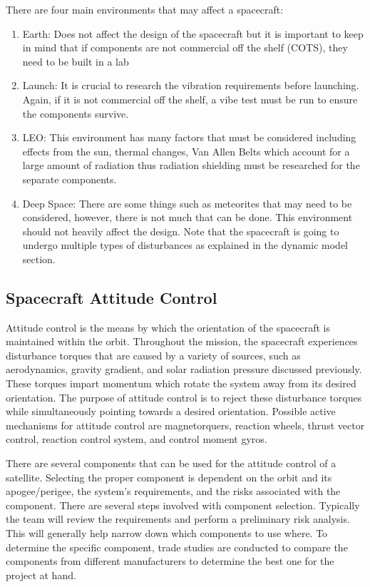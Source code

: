 There are four main environments that may affect a spacecraft:
\begin{enumerate}[itemsep=-5pt]
\item Earth: Does not affect the design of the spacecraft but it is
  important to keep in mind that if components are not commercial off
  the shelf (COTS), they need to be built in a lab 
\item Launch: It is crucial to research the vibration requirements
  before launching. Again, if it is not commercial off the shelf, a
  vibe test must be run to ensure the components survive.  
\item LEO: This environment has many factors that must be considered
  including effects from the sun, thermal changes, Van Allen Belts
  which account for a large amount of radiation thus radiation
  shielding must be researched for the separate components. 
\item Deep Space: There are some things such as meteorites that may
  need to be considered, however, there is not much that can be
  done. This environment should not heavily affect the design.
Note that the spacecraft is going to undergo multiple types of
disturbances as explained in the dynamic model section.
\end{enumerate}

\subsection{Spacecraft Attitude Control}

Attitude control is the means by which the orientation of the
spacecraft is maintained within the orbit. Throughout the mission, the
spacecraft experiences disturbance torques that are caused by a
variety of sources, such as aerodynamics, gravity gradient, and solar
radiation pressure discussed previously. These torques impart momentum
which rotate the system away from its desired orientation. The purpose
of attitude control is to reject these disturbance torques while
simultaneously pointing towards a desired orientation. Possible active
mechanisms for attitude control are magnetorquers, reaction wheels,
thrust vector control, reaction control system, and control moment
gyros.

There are several components that can be used for the attitude control
of a satellite. Selecting the proper component is dependent on the
orbit and its apogee/perigee, the system's requirements, and the risks
associated with the component. There are several steps involved with
component selection. Typically the team will review the requirements
and perform a preliminary risk analysis. This will generally help
narrow down which components to use where. To determine the specific
component, trade studies are conducted to compare the components from
different manufacturers to determine the best one for the project at
hand.

